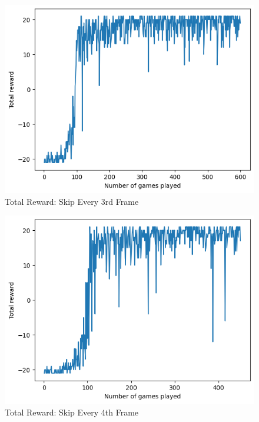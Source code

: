 \documentclass[12pt, a4paper, twocolumn]{article} %
\begin{document}
\begin{figure}[H]
	\includegraphics[width=\linewidth]{tr_sk3.PNG} %
	\caption{Total Reward: Skip Every 3rd Frame} %
\end{figure}

\begin{figure}[H]
	\includegraphics[width=\linewidth]{tr_sk4.PNG} %
	\caption{Total Reward: Skip Every 4th Frame} %
\end{figure}
\end{document}
